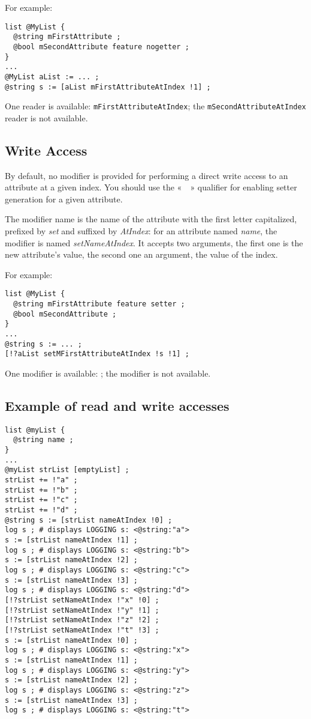 For example:
\begin{lstlisting}[language=galgas]
list @MyList {
  @string mFirstAttribute ;
  @bool mSecondAttribute feature nogetter ;
}
...
@MyList aList := ... ;
@string s := [aList mFirstAttributeAtIndex !1] ;
\end{lstlisting}

One reader is available: \lstinline[language=galgas]!mFirstAttributeAtIndex!; the \lstinline[language=galgas]!mSecondAttributeAtIndex! reader is not available.


\subsection{Write Access}

By default, no modifier is provided for performing a direct write access to an attribute at a given index. You should use the «~~» qualifier for enabling setter generation for a given attribute.

The modifier name is the name of the attribute with the first letter capitalized, prefixed by \emph{set} and suffixed by \emph{AtIndex}: for an attribute named \emph{name}, the modifier is named \emph{setNameAtIndex}. It accepts two arguments, the first one is the new attribute's value, the second one an  argument, the value of the index.

For example:

\begin{lstlisting}[language=galgas]
list @MyList {
  @string mFirstAttribute feature setter ;
  @bool mSecondAttribute ;
}
...
@string s := ... ;
[!?aList setMFirstAttributeAtIndex !s !1] ;
\end{lstlisting}

One modifier is available: ; the  modifier is not available.

\subsection{Example of read and write accesses}

\begin{lstlisting}[language=galgas]
list @myList {
  @string name ;
}
...
@myList strList [emptyList] ;
strList += !"a" ;
strList += !"b" ;
strList += !"c" ;
strList += !"d" ;
@string s := [strList nameAtIndex !0] ;
log s ; # displays LOGGING s: <@string:"a">
s := [strList nameAtIndex !1] ;
log s ; # displays LOGGING s: <@string:"b">
s := [strList nameAtIndex !2] ;
log s ; # displays LOGGING s: <@string:"c">
s := [strList nameAtIndex !3] ;
log s ; # displays LOGGING s: <@string:"d">
[!?strList setNameAtIndex !"x" !0] ;
[!?strList setNameAtIndex !"y" !1] ;
[!?strList setNameAtIndex !"z" !2] ;
[!?strList setNameAtIndex !"t" !3] ;
s := [strList nameAtIndex !0] ;
log s ; # displays LOGGING s: <@string:"x">
s := [strList nameAtIndex !1] ;
log s ; # displays LOGGING s: <@string:"y">
s := [strList nameAtIndex !2] ;
log s ; # displays LOGGING s: <@string:"z">
s := [strList nameAtIndex !3] ;
log s ; # displays LOGGING s: <@string:"t">
\end{lstlisting}
